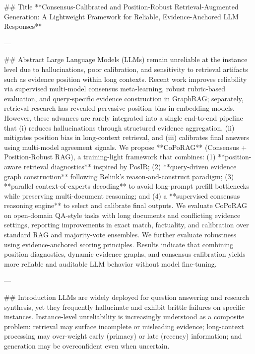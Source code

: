 ## Title  
**Consensus-Calibrated and Position-Robust Retrieval-Augmented Generation: A Lightweight Framework for Reliable, Evidence-Anchored LLM Responses**

---

## Abstract  
Large Language Models (LLMs) remain unreliable at the instance level due to hallucinations, poor calibration, and sensitivity to retrieval artifacts such as evidence position within long contexts. Recent work improves reliability via supervised multi-model consensus meta-learning, robust rubric-based evaluation, and query-specific evidence construction in GraphRAG; separately, retrieval research has revealed pervasive position bias in embedding models. However, these advances are rarely integrated into a single end-to-end pipeline that (i) reduces hallucinations through structured evidence aggregation, (ii) mitigates position bias in long-context retrieval, and (iii) calibrates final answers using multi-model agreement signals. We propose **CoPoRAG** (Consensus + Position-Robust RAG), a training-light framework that combines: (1) **position-aware retrieval diagnostics** inspired by PosIR; (2) **query-driven evidence graph construction** following Relink’s reason-and-construct paradigm; (3) **parallel context-of-experts decoding** to avoid long-prompt prefill bottlenecks while preserving multi-document reasoning; and (4) a **supervised consensus reasoning engine** to select and calibrate final outputs. We evaluate CoPoRAG on open-domain QA-style tasks with long documents and conflicting evidence settings, reporting improvements in exact match, factuality, and calibration over standard RAG and majority-vote ensembles. We further evaluate robustness using evidence-anchored scoring principles. Results indicate that combining position diagnostics, dynamic evidence graphs, and consensus calibration yields more reliable and auditable LLM behavior without model fine-tuning.

---

## Introduction  
LLMs are widely deployed for question answering and research synthesis, yet they frequently hallucinate and exhibit brittle failures on specific instances. Instance-level unreliability is increasingly understood as a composite problem: retrieval may surface incomplete or misleading evidence; long-context processing may over-weight early (primacy) or late (recency) information; and generation may be overconfident even when uncertain.

